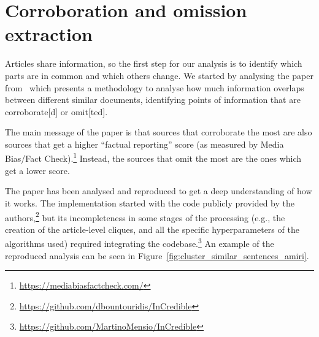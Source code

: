 

\section{Corroboration and omission extraction}
\label{sec:cgs_cross_referencing}
Articles share information, so the first step for our analysis is to identify which parts are in common and which others change.
We started by analysing the paper from~\citet{bountouridis2018explaining} which presents a methodology to analyse how much information overlaps between different similar documents, identifying points of information that are \gls{corroborate}[d] or \gls{omit}[ted].

The main message of the paper is that sources that \gls{corroborate} the most are also sources that get a higher ``factual reporting'' score (as measured by Media Bias/Fact Check).\footnote{\url{https://mediabiasfactcheck.com/}}
Instead, the sources that \gls{omit} the most are the ones which get a lower score.


The paper has been analysed and reproduced to get a deep understanding of how it works. The implementation started with the code publicly provided by the authors,\footnote{\url{https://github.com/dbountouridis/InCredible}} but its incompleteness in some stages of the processing (e.g., the creation of the article-level cliques, and all the specific hyperparameters of the algorithms used) required integrating the codebase.\footnote{\url{https://github.com/MartinoMensio/InCredible}}
An example of the reproduced analysis can be seen in Figure~\ref{fig:cluster_similar_sentences_amiri}.

